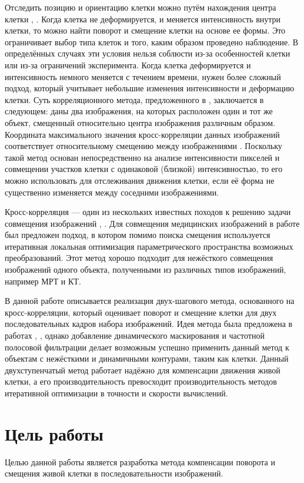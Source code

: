 \documentclass[oneside,final,14pt]{extreport}
\begin{document}
Отследить позицию и ориентацию клетки можно путём нахождения центра клетки \cite{jahne2004practical}, \cite{soo2005large}. Когда клетка не деформируется, и меняется интенсивность внутри клетки, то можно найти поворот и смещение клетки на основе ее формы. Это ограничивает выбор типа клеток и того, каким образом проведено наблюдение. В определённых случаях эти условия нельзя соблюсти из-за особенностей клетки или из-за ограничений эксперимента.
Когда клетка деформируется и интенсивность немного меняется с течением времени, нужен
более сложный подход, который учитывает небольшие изменения интенсивности и деформацию клетки. Суть корреляционного метода, предложенного в \cite{wilson2006correlation}, заключается в следующем: даны два изображения, на которых расположен один и тот же объект, смещенный относительно центра изображения различным образом. Координата максимального значения кросс-корреляции данных изображений соответствует относительному смещению между изображениями \cite{gonzalez2002digital}. Поскольку такой метод основан непосредственно на анализе интенсивности пикселей и совмещении участков клетки с одинаковой (близкой) интенсивностью, то его можно использовать для отслеживания движения клетки, если её форма не существенно изменяется между соседними изображениями.

 Кросс-корреляция --- один из нескольких известных походов к решению задачи совмещения изображений \cite{zitova2003image}, \cite{maes2003medical}. Для совмещения медицинских изображений в работе \cite{hutton2003software} был предложен подход, в котором помимо поиска смещения используется итеративная локальная оптимизация параметрического пространства возможных преобразований. Этот метод хорошо подходит для нежёсткого совмещения изображений одного объекта, полученными из различных типов изображений, например МРТ и КТ.

В данной работе описывается реализация двух-шагового метода, основанного на кросс-корреляции, который оценивает поворот и смещение клетки для двух последовательных кадров набора изображений. Идея метода была предложена в работах \cite{reddy1996fft}, \cite{sheng1986experiments}, однако добавление динамического маскирования и частотной полосовой фильтрации делает возможным успешно применить данный метод к объектам с нежёсткими и динамичными контурами, таким как клетки. Данный двухступенчатый метод работает надёжно для компенсации движения живой клетки, а его производительность превосходит  производительность методов итеративной оптимизации в точности и скорости вычислений.
\chapter{Цель работы}
Целью данной работы является разработка метода компенсации поворота и смещения живой клетки в последовательности изображений.
\end{document}

